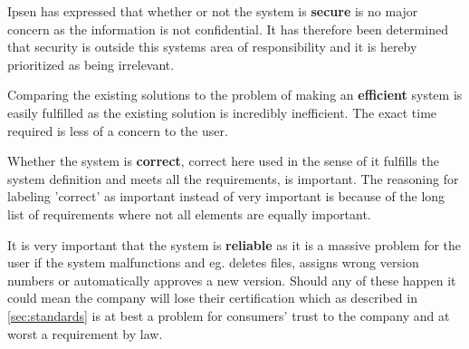 Ipsen has expressed that whether or not the system is \textbf{secure} is no major concern as the information is not confidential.
It has therefore been determined that security is outside this systems area of responsibility and it is hereby prioritized as being irrelevant.

Comparing the existing solutions to the problem of making an \textbf{efficient} system is easily fulfilled as the existing solution is incredibly inefficient.
The exact time required is less of a concern to the user.

Whether the system is \textbf{correct}, correct here used in the sense of it fulfills the system definition and meets all the requirements, is important.
The reasoning for labeling 'correct' as important instead of very important is because of the long list of requirements where not all elements are equally important.

It is very important that the system is \textbf{reliable} as it is a massive problem for the user if the system malfunctions and eg. deletes files, assigns wrong version numbers or automatically approves a new version.
Should any of these happen it could mean the company will lose their certification which as described in \cref{sec:standards} is at best a problem for consumers' trust to the company and at worst a requirement by law.

